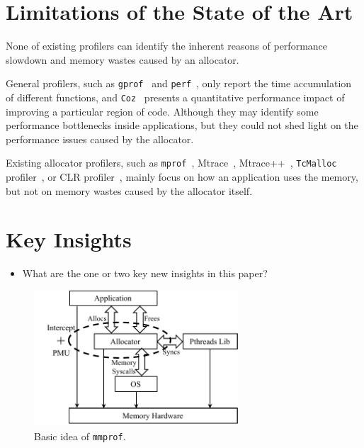 \documentclass[pageno]{jpaper}
\begin{document}
\section{Limitations of the State of the Art}
\label{sec:limitations}

None of existing profilers can identify the inherent reasons of performance slowdown and memory wastes caused by an allocator. 

General profilers, such as \texttt{gprof}~\cite{DBLP:conf/sigplan/GrahamKM82} and \texttt{perf}~\cite{perf}, only report the time accumulation of different functions, and \texttt{Coz}~\cite{Coz} presents a quantitative performance impact of improving a particular region of code. Although they may identify some performance bottlenecks inside applications, but they could not shed light on the performance issues caused by the allocator. 

 Existing allocator profilers, such as \texttt{mprof}~\cite{Zorn:1988:MAP:894814}, Mtrace~\cite{mtrace}, Mtrace++~\cite{Lee:2000:DMM:786772.787150}, \texttt{TcMalloc} profiler~\cite{tcmalloc-profiler}, or CLR profiler~\cite{lupasc2014dynamic}, mainly focus on how an application uses the memory, but not on memory wastes caused by the allocator itself. 


\section{Key Insights}
\label{sec:key-insights}

\begin{itemize}
\item What are the one or two key new insights in this paper?
\end{itemize}

\begin{figure}[!ht]
\centering
\includegraphics[width=3in]{figures/overview}
\caption{Basic idea of \texttt{mmprof}.\label{fig:basicidea}}
\end{figure}
\end{document}
